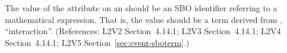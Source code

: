 The value of the  attribute on an \Event should be
an SBO identifier referring to a mathematical expression.  That is, the
value should be a term derived from \sbointeractionID,
``interaction''.  (References: L2V2 Section~4.14.1; L2V3
Section~4.14.1; L2V4 Section~4.14.1; L2V5 Section~\ref{sec:event-sboterm}.)
